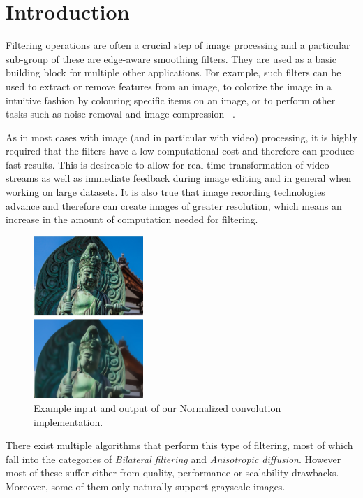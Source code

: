 \section{Introduction}\label{sec:intro}

Filtering operations are often a crucial step of image processing and a particular sub-group of these are edge-aware smoothing filters. 
They are used as a basic building block for multiple other applications.
For example, such filters can be used to extract or remove features from an
image, to colorize the image in a intuitive fashion by colouring specific
items on an image, or to perform other tasks such as noise removal and
image compression ~\cite{GastalOliveira2011DomainTransform}.

As in most cases with image (and in particular with video) processing, it is highly required that the filters have a low computational cost and therefore can produce fast results. This is desireable to allow for real-time transformation of video streams as well as immediate feedback during image editing and in general when working on large datasets. 
It is also true that image recording technologies advance and therefore can create images of greater resolution, which means an increase in
the amount of computation needed for filtering.

\setlength\fboxsep{0pt}
\setlength\fboxrule{0.5pt}
 
\begin{figure}\vspace{-1mm}
  \includegraphics[trim=-30mm 0mm 0mm 0mm, clip, width=0.37\textwidth]{figures/input_output}
  \caption{Example input and output of our Normalized convolution implementation.\label{performance}}
\end{figure}


There exist multiple algorithms that perform this type of filtering, most of which fall into the categories of \textit{Bilateral filtering} and \textit{Anisotropic diffusion}. However most of these suffer either from quality, performance or scalability drawbacks. Moreover, some of them only naturally support grayscale images.

